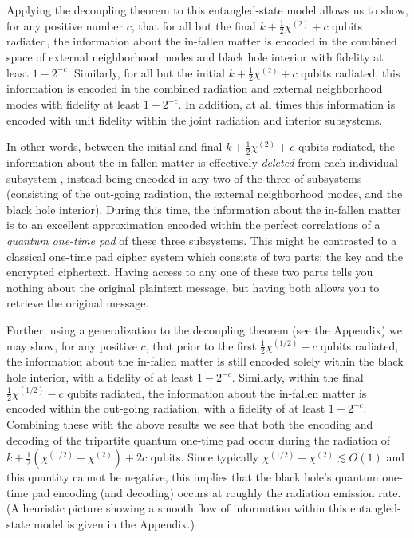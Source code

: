 \documentclass[twocolumn,aps,prl]{revtex4}
\begin{document}
Applying the decoupling theorem \cite{Abey06} to this entangled-state
model allows us to show, for any positive number $c$, that for all
but the final $k+\frac{1}{2}\chi^{(2)}+c$ qubits radiated, the
information about the in-fallen matter is encoded in the combined space
of external neighborhood modes and black hole interior with fidelity
at least $1-2^{-c}$. Similarly, for all but the initial
$k+\frac{1}{2}\chi^{(2)}+c$ qubits radiated, this information is encoded
in the combined radiation and external neighborhood modes with fidelity
at least $1-2^{-c}$.  In addition, at all times this information is
encoded with unit fidelity within the joint radiation and interior subsystems.

In other words, between the initial and final $k+\frac{1}{2}\chi^{(2)}+c$
qubits radiated, the information about the in-fallen matter is effectively
{\it deleted\/} from each individual subsystem \cite{me,Kretschmann},
instead being encoded in any two of the three of subsystems (consisting of
the out-going radiation, the external neighborhood modes, and the black hole
interior). During this time, the information about the in-fallen matter
is to an excellent approximation encoded within the perfect correlations
of a {\it quantum one-time pad} \cite{me,Leung02} of these three subsystems.
This might be contrasted to a classical one-time pad cipher system
which consists of two parts: the key and the encrypted ciphertext.
Having access to any one of these two parts tells you nothing about
the original plaintext message, but having both allows you to retrieve
the original message.

Further, using a generalization to the decoupling theorem (see
the Appendix) we may show, for any positive $c$, that
prior to the first $\frac{1}{2}\chi^{(1/2)} -c$ qubits radiated,
the information about the in-fallen matter is still encoded solely
within the black hole interior, with a fidelity of at least
$1-2^{-c}$. Similarly, within the final $\frac{1}{2}\chi^{(1/2)} -c$
qubits radiated, the information about the in-fallen matter is encoded
within the out-going radiation, with a fidelity of at least
$1-2^{-c}$. Combining these with the above results we see that both
the encoding and decoding of the tripartite quantum one-time pad
occur during the radiation of
$k+\frac{1}{2}(\chi^{(1/2)}-\chi^{(2)}) + 2c$ qubits. Since
typically $ \chi^{(1/2)}-\chi^{(2)} \lesssim O(1)$ and this quantity
cannot be negative, this implies that the black hole's quantum one-time
pad encoding (and decoding) occurs at roughly the radiation emission rate.
(A heuristic picture showing a smooth flow of information within this
entangled-state model is given in the Appendix.)
\end{document}
